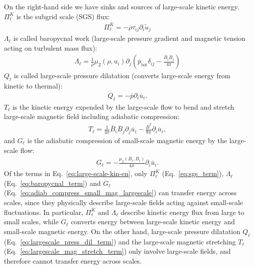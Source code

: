 \documentclass[]{article}
\begin{document}
%
On the right-hand side we have sinks and sources of large-scale kinetic energy. $\Pi^K_{\ell}$ is the subgrid scale (SGS) flux:
\begin{align}\label{eq:sgs_term}
	\Pi^K_{\ell} = - \overline{\rho} \tau_{ij} \partial_i \tilde{u}_j
\end{align}
%
$\Lambda_{\ell}$ is called baropycnal work (large-scale pressure gradient and magnetic tension acting on turbulent mass flux):
\begin{align}\label{eq:baropycnal_term}
	\Lambda_{\ell} = \frac{1}{\overline{\rho}} \mu_2 (\rho, u_i) \partial_j \left( \overline{p}_{\mathrm{tot}} \delta_{ij} -  \frac{\overline{B}_i \overline{B}_j}{4\pi} \right)
\end{align}
%
$Q_{\ell}$ is called large-scale pressure dilatation (converts large-scale energy from kinetic to thermal): 
\begin{align}\label{eq:largescale_press_dil_term}
	Q_{\ell} = - \overline{p} \partial_i  \overline{u}_i . 
\end{align}
$T_{\ell}$ is the kinetic energy expended by the large-scale flow to bend and stretch large-scale magnetic field including adiabatic compression:
%
\begin{align}\label{eq:largescale_mag_stretch_term}
	T_{\ell} = \frac{1}{4\pi} \overline{B}_i \overline{ B}_j   \partial_j \overline{u}_i - \frac{\overline{B}^{2}}{8\pi} \partial_i  \overline{u}_i ,
\end{align}
%
and $G_{\ell}$ is the adiabatic compression of small-scale magnetic energy by the large-scale flow:
%
\begin{align}\label{eq:adiab_compress_small_mag_largescale}
	G_{\ell} = -  \frac{\mu_2 (B_i, B_i)}{4\pi} \partial_i  \overline{u}_i . 
\end{align}
%
Of the terms in Eq.~\eqref{eq:large-scale-kin-en}, only $\Pi^K_{\ell}$ (Eq.~\ref{eq:sgs_term}), $\Lambda_{\ell}$ (Eq.~\ref{eq:baropycnal_term}) and $G_{\ell}$ (Eq.~\ref{eq:adiab_compress_small_mag_largescale}) can transfer energy across scales, since they physically describe large-scale fields acting against small-scale fluctuations. In particular, $\Pi^K_{\ell}$ and $\Lambda_{\ell}$ describe kinetic energy flux from large to small scales, while $G_{\ell}$ converts energy between large-scale kinetic energy and small-scale magnetic energy.
On the other hand, large-scale pressure dilatation $Q_{\ell}$ (Eq.~\ref{eq:largescale_press_dil_term}) and the large-scale magnetic stretching $T_{\ell}$ (Eq.~\ref{eq:largescale_mag_stretch_term}) only involve large-scale fields, and therefore cannot transfer energy across scales.
\end{document}
